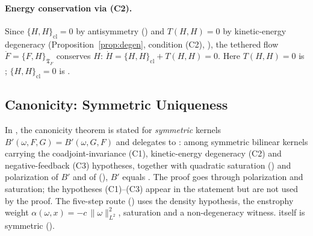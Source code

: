 \documentclass[11pt,a4paper]{article}
\theoremstyle{plain}
\theoremstyle{definition}
\theoremstyle{remark}
\newcommand{\Tf}{\mathfrak{T}_F}
\begin{document}
\paragraph{Energy conservation via (C2).} Since $\{H,H\}_{\mathrm{cl}}=0$ by antisymmetry () and $T(H,H)=0$ by kinetic-energy degeneracy (Proposition~\ref{prop:degen}, condition (C2), ), the tethered flow $\dot F=\{F,H\}_{\Tf}$ conserves $H$: $\dot H=\{H,H\}_{\mathrm{cl}}+T(H,H)=0$. Here $T(H,H)=0$ is ; $\{H,H\}_{\mathrm{cl}}=0$ is .

\subsection{Canonicity: Symmetric Uniqueness}
In , the canonicity theorem  is stated for \emph{symmetric} kernels $B'(\omega,F,G)=B'(\omega,G,F)$ and delegates to : among symmetric bilinear kernels carrying the coadjoint-invariance (C1), kinetic-energy degeneracy (C2) and negative-feedback (C3) hypotheses, together with quadratic saturation () and polarization of $B'$ and of  (), $B'$ equals . The proof goes through polarization and saturation; the hypotheses (C1)--(C3) appear in the statement but are not used by the proof. The five-step route () uses the density hypothesis, the enstrophy weight $\alpha(\omega,x)=-c\,\|\omega\|_{L^2}^2$, saturation and a non-degeneracy witness.  itself is symmetric ().
\end{document}
